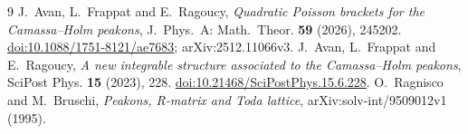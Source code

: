 \documentclass[11pt]{article}
\begin{document}
\small
\begin{thebibliography}{9}
 J.~Avan, L.~Frappat and E.~Ragoucy, \emph{Quadratic Poisson brackets for the Camassa--Holm peakons}, J.~Phys.~A: Math.~Theor. \textbf{59} (2026), 245202. \href{https://doi.org/10.1088/1751-8121/ae7683}{doi:10.1088/1751-8121/ae7683}; arXiv:2512.11066v3.
 J.~Avan, L.~Frappat and E.~Ragoucy, \emph{A new integrable structure associated to the Camassa--Holm peakons}, SciPost Phys. \textbf{15} (2023), 228. \href{https://doi.org/10.21468/SciPostPhys.15.6.228}{doi:10.21468/SciPostPhys.15.6.228}.
 O.~Ragnisco and M.~Bruschi, \emph{Peakons, R-matrix and Toda lattice}, arXiv:solv-int/9509012v1 (1995).
\end{thebibliography}
\end{document}
